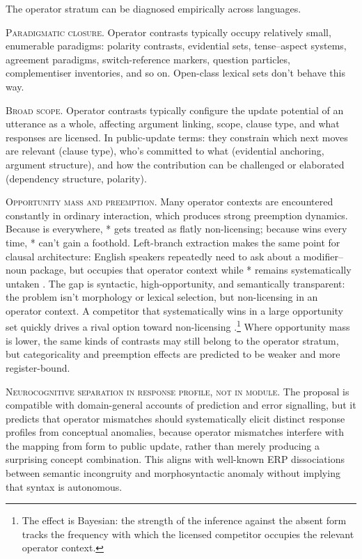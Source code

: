 \documentclass[12pt,letterpaper]{article}
\begin{document}
The operator stratum can be diagnosed empirically across languages.

{\sloppy \textsc{Paradigmatic closure.} Operator contrasts typically occupy relatively small, enumerable paradigms: polarity contrasts, evidential sets, tense--aspect systems, agreement paradigms, switch-reference markers, question particles, complementiser inventories, and so on. Open-class lexical sets don't behave this way.\par}

\textsc{Broad scope.} Operator contrasts typically configure the update potential of an utterance as a whole, affecting argument linking, scope, clause type, and what responses are licensed. In public-update terms: they constrain which next moves are relevant (clause type), who's committed to what (evidential anchoring, argument structure), and how the contribution can be challenged or elaborated (dependency structure, polarity).

\textsc{Opportunity mass and preemption.} Many operator contexts are encountered constantly in ordinary interaction, which produces strong preemption dynamics. Because  is everywhere, * gets treated as flatly non-licensing; because  wins every time, * can't gain a foothold. Left-branch extraction makes the same point for clausal architecture: English speakers repeatedly need to ask about a modifier--noun package, but  occupies that operator context while * remains systematically untaken \citep{author2026lbe}. The gap is syntactic, high-opportunity, and semantically transparent: the problem isn't morphology or lexical selection, but non-licensing in an operator context. A competitor that systematically wins in a large opportunity set quickly drives a rival option toward non-licensing \citep{bybee2006,bybee2010}.\footnote{The effect is Bayesian: the strength of the inference against the absent form tracks the frequency with which the licensed competitor occupies the relevant operator context.} Where opportunity mass is lower, the same kinds of contrasts may still belong to the operator stratum, but categoricality and preemption effects are predicted to be weaker and more register-bound.

\textsc{Neurocognitive separation in response profile, not in module.} The proposal is compatible with domain-general accounts of prediction and error signalling, but it predicts that operator mismatches should systematically elicit distinct response profiles from conceptual anomalies, because operator mismatches interfere with the mapping from form to public update, rather than merely producing a surprising concept combination. This aligns with well-known ERP dissociations between semantic incongruity and morphosyntactic anomaly \citep{kutashillyard1980,osterhoutholcomb1992,friederici2011} without implying that syntax is autonomous.
\end{document}
